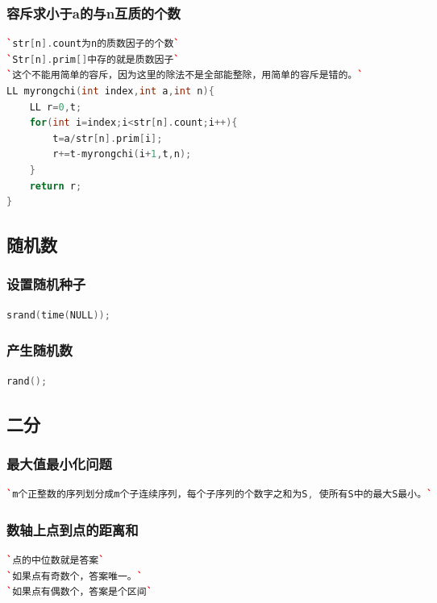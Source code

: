\documentclass[a4paper]{article}
\begin{document}
\begin{CJK*}{UTF8}{gbsn}
\begin{multicols}{3}
\begin{flushleft}
\subsubsection{容斥求小于a的与n互质的个数}
\begin{lstlisting}[language={c++}]
`str[n].count为n的质数因子的个数`
`Str[n].prim[]中存的就是质数因子`
`这个不能用简单的容斥，因为这里的除法不是全部能整除，用简单的容斥是错的。`
LL myrongchi(int index,int a,int n){
	LL r=0,t;
	for(int i=index;i<str[n].count;i++){
		t=a/str[n].prim[i];
		r+=t-myrongchi(i+1,t,n);
	}
	return r;	
}
\end{lstlisting}

\subsection{随机数}

\subsubsection{设置随机种子}
\begin{lstlisting}[language={c++}]
srand(time(NULL));
\end{lstlisting}

\subsubsection{产生随机数}
\begin{lstlisting}[language={c++}]
rand();
\end{lstlisting}




\subsection{二分}

\subsubsection{最大值最小化问题}
\begin{lstlisting}[language={c++}]
`m个正整数的序列划分成m个子连续序列，每个子序列的个数字之和为S, 使所有S中的最大S最小。`
\end{lstlisting}


\subsubsection{数轴上点到点的距离和}
\begin{lstlisting}[language={c++}]
`点的中位数就是答案`
`如果点有奇数个，答案唯一。`
`如果点有偶数个，答案是个区间`
\end{lstlisting}


\end{flushleft}
\end{multicols}
\end{CJK*}
\end{document}
